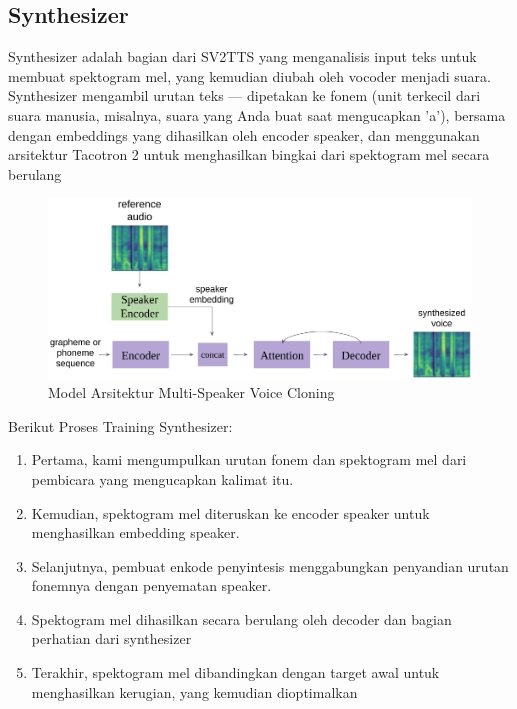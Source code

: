 \subsection{Synthesizer}
Synthesizer adalah bagian dari SV2TTS yang menganalisis input teks untuk membuat spektogram mel, yang kemudian diubah oleh vocoder menjadi suara.
Synthesizer mengambil urutan teks — dipetakan ke fonem (unit terkecil dari suara manusia, misalnya, suara yang Anda buat saat mengucapkan 'a'), bersama dengan embeddings yang dihasilkan oleh encoder speaker, dan menggunakan arsitektur Tacotron 2 untuk menghasilkan bingkai dari spektogram mel secara berulang
\begin{figure}[H]
        \centerline{\includegraphics[scale=.35]{figures/model}}
        \caption{Model Arsitektur Multi-Speaker Voice Cloning \cite{DBLP:journals/corr/abs-1806-04558}}
		\label{model}
\end{figure}

Berikut Proses Training Synthesizer:

\begin{enumerate}
\item Pertama, kami mengumpulkan urutan fonem dan spektogram mel dari pembicara yang mengucapkan kalimat itu.
\item Kemudian, spektogram mel diteruskan ke encoder speaker untuk menghasilkan embedding speaker.
\item Selanjutnya, pembuat enkode penyintesis menggabungkan penyandian urutan fonemnya dengan penyematan speaker.
\item Spektogram mel dihasilkan secara berulang oleh decoder dan bagian perhatian dari synthesizer
\item Terakhir, spektogram mel dibandingkan dengan target awal untuk menghasilkan kerugian, yang kemudian dioptimalkan
\end{enumerate}

